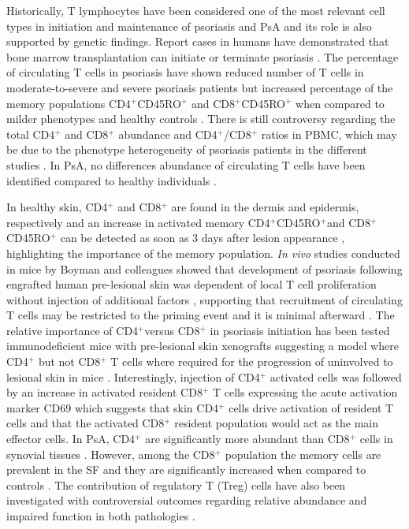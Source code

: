 Historically, T lymphocytes have been considered one of the most relevant cell types in initiation and maintenance of psoriasis and PsA and its role is also supported by genetic findings. Report cases in humans have demonstrated that bone marrow transplantation can initiate or terminate psoriasis \parencite{Eedy1990, Gardembas1990}. The percentage of circulating T cells in psoriasis have shown reduced number of T cells in moderate-to-severe and severe psoriasis patients but increased percentage of the memory populations CD4$^{+}$CD45RO$^{+}$ and CD8$^{+}$CD45RO$^{+}$ when compared to milder phenotypes and healthy controls \parencite{Lecewicz-Toruń2001,Langewouters2008}. There is still controversy regarding the total CD4$^+$ and CD8$^{+}$ abundance and CD4$^{+}$/CD8$^{+}$ ratios in PBMC, which may be due to the phenotype heterogeneity of psoriasis patients in the different studies \parencite{Lecewicz-Toruń2001,Cameron2003,Langewouters2008}. In PsA, no differences  abundance of circulating T cells have been identified compared to healthy individuals \parencite{Costello1999}.

In healthy skin, CD4$^{+}$ and CD8$^{+}$ are found in the dermis and epidermis, respectively \parencite{Clark2006,Perera2012} and an increase in activated memory CD4$^{+}$CD45RO$^{+}$and CD8$^{+}$CD45RO$^{+}$ can be detected as soon as 3 days after lesion appearance \parencite{Clark2006}, highlighting the importance of the memory population. \textit{In vivo} studies conducted in mice by Boyman and colleagues showed that development of psoriasis following engrafted human pre-lesional skin was dependent of local T cell proliferation without injection of additional factors \parencite{Boyle2013}, supporting that recruitment of circulating T cells may be restricted to the priming event and it is minimal afterward \parencite{Perera2012}. The relative importance of CD4$^{+}$versus CD8$^{+}$ in psoriasis initiation has been tested immunodeficient mice with pre-lesional skin xenografts suggesting a model where CD4$^{+}$ but not CD8$^{+}$ T cells where required for the progression of uninvolved to lesional skin in mice \parencite{Nickoloff1999}. Interestingly, injection of CD4$^{+}$ activated cells was followed by an increase in activated resident CD8$^{+}$ T cells expressing the acute activation marker CD69 which suggests that skin CD4$^{+}$ cells drive activation of resident T cells and that the activated CD8$^{+}$ resident population would act as the main effector cells. In PsA, CD4$^{+}$ are significantly more abundant than CD8$^{+}$ cells in synovial tissues \parencite{Diani2015}. However, among the CD8$^{+}$ population the memory cells are prevalent in the SF and they are significantly increased when compared to controls \parencite{Costello1999}. The contribution of regulatory T (Treg) cells have also been investigated with controversial outcomes regarding relative abundance and impaired function in both pathologies \parencite{Perera2012}. 

